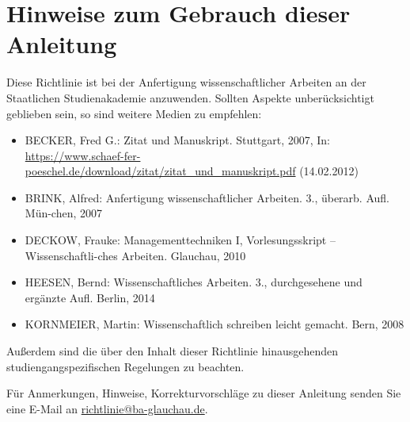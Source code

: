 \section{Hinweise zum Gebrauch dieser Anleitung}
\label{weitere-hinweise-gebrauch-anleitung}
Diese Richtlinie ist bei der Anfertigung wissenschaftlicher Arbeiten an der Staatlichen Studienakademie anzuwenden.
Sollten Aspekte unberücksichtigt geblieben sein, so sind weitere Medien zu empfehlen:
\begin{itemize}
    \item BECKER, Fred G.: Zitat und Manuskript. Stuttgart, 2007, In: \href{https://www.schaef-fer-poeschel.de/download/zitat/zitat_und_manuskript.pdf}{https://www.schaef-fer-poeschel.de/download/zitat/zitat\_und\_manuskript.pdf} (14.02.2012)
    \item BRINK, Alfred: Anfertigung wissenschaftlicher Arbeiten. 3., überarb. Aufl. Mün-chen, 2007
    \item DECKOW, Frauke: Managementtechniken I, Vorlesungsskript – Wissenschaftli-ches Arbeiten. Glauchau, 2010
    \item HEESEN, Bernd: Wissenschaftliches Arbeiten. 3., durchgesehene und ergänzte Aufl. Berlin, 2014
    \item KORNMEIER, Martin: Wissenschaftlich schreiben leicht gemacht. Bern, 2008
\end{itemize}

Außerdem sind die über den Inhalt dieser Richtlinie hinausgehenden studiengangspezifischen Regelungen zu beachten.

Für Anmerkungen, Hinweise, Korrekturvorschläge zu dieser Anleitung senden Sie eine E-Mail an \href{mailto:richtlinie@ba-glauchau.de}{richtlinie@ba-glauchau.de}.
